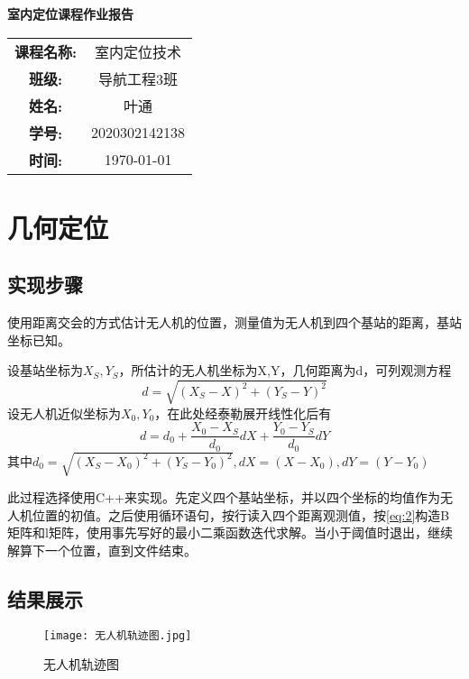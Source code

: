 \documentclass{ctexart}
\begin{document}
\newpage
\thispagestyle{empty}
    \begin{center}
        \Huge\textbf{室内定位课程作业报告}
    \end{center}
\vspace*{\fill}

\begin{table}[h]
    \centering
    \large
    \begin{tabular}{cc}
    \textbf{课程名称:} & 室内定位技术 \\ \cline{2-2}
    \textbf{班级:} & 导航工程3班 \\ \cline{2-2}
    \textbf{姓名:} & 叶通 \\  \cline{2-2}
    \textbf{学号:} & 2020302142138 \\ \cline{2-2}
    \textbf{时间:} & \today \\ \cline{2-2}
    \end{tabular}
\end{table}

\newpage
{}
\setcounter{page}{1}
\tableofcontents

\newpage
\setcounter{page}{1}

\section{几何定位}
\subsection{实现步骤}
使用距离交会的方式估计无人机的位置，测量值为无人机到四个基站的距离，基站坐标已知。

设基站坐标为$X_S,Y_S$，所估计的无人机坐标为X,Y，几何距离为d，可列观测方程
\begin{equation}
d=\sqrt{(X_S-X)^2+(Y_S-Y)^2}
\end{equation}
设无人机近似坐标为$X_0,Y_0$，在此处经泰勒展开线性化后有
\begin{equation}
d=d_0+\frac{X_0-X_S}{d_0}dX+\frac{Y_0-Y_S}{d_0}dY
\label{eq:2}
\end{equation}
其中$d_0=\sqrt{(X_S-X_0)^2+(Y_S-Y_0)^2},dX=(X-X_0),dY=(Y-Y_0)$

此过程选择使用C++来实现。先定义四个基站坐标，并以四个坐标的均值作为无人机位置的初值。之后使用循环语句，按行读入四个距离观测值，按\eqref{eq:2}构造B矩阵和l矩阵，使用事先写好的最小二乘函数迭代求解。当小于阈值时退出，继续解算下一个位置，直到文件结束。

\subsection{结果展示}
\begin{figure}[H]
\texttt{[image: 无人机轨迹图.jpg]}
\caption{无人机轨迹图}
\end{figure}
\end{document}
